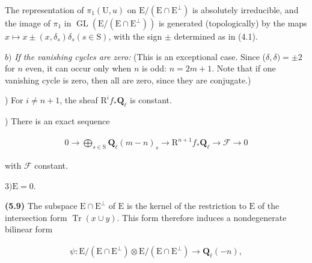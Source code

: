 \documentclass[10pt,leqno]{article}
\begin{document}
\noindent The representation of \(\pi _{1}(\mathrm{U},u)\) on \(\mathrm{E}/(\mathrm{E}\cap \mathrm{E}^{\perp })\) is absolutely irreducible, and the image of \(\pi _{1}\) in \(\operatorname{GL}(\mathrm{E}/(\mathrm{E}\cap \mathrm{E}^{\perp }))\) is generated (topologically) by the maps \(x\longmapsto x\pm (x,\delta _{s})\delta _{s} (s\in \mathrm{S})\), with the sign \(\pm \) determined as in (4.1).\par

\clearpage

\label{physical-22}\par\smallskip

\noindent \(b)\) \emph{If the vanishing cycles are zero:} (This is an exceptional case. Since (\(\delta ,\delta )=\pm 2\) for \(n\) even, it can occur only when \(n\) is odd: \(n=2m+1\). Note that if one vanishing cycle is zero, then all are zero, since they are conjugate.)\par

) For \(i\ne n+1\), the sheaf \(\mathrm{R}^{i} f_{*}\mathbf{Q}_{\ell }\) is constant.\par

) There is an exact sequence\par

\begin{equation*}\begin{gathered}0 \longrightarrow  \bigoplus\limits_{s\in \mathrm{S}} \mathbf{Q}_{\ell }(m- n)_{s} \longrightarrow  \mathrm{R}^{n+1}f_{*}\mathbf{Q}_{\ell } \longrightarrow  \mathcal{F}  \longrightarrow  0\end{gathered}\end{equation*}

\noindent with \(\mathcal{F} \) constant.\par

\noindent \(3) \mathrm{E}=0\).\par

\noindent \textbf{(5.9)} The subspace \(\mathrm{E}\cap \mathrm{E}^{\perp }\) of \(\mathrm{E}\) is the kernel of the restriction to \(\mathrm{E}\) of the intersection form \(\operatorname{Tr}(x\cup y)\). This form therefore induces a nondegenerate bilinear form\par

\begin{equation*}\begin{gathered}\psi  : \mathrm{E}/(\mathrm{E}\cap \mathrm{E}^{\perp })\otimes \mathrm{E}/(\mathrm{E}\cap \mathrm{E}^{\perp }) \longrightarrow  \mathbf{Q}_{\ell }(- n),\end{gathered}\end{equation*}
\end{document}
